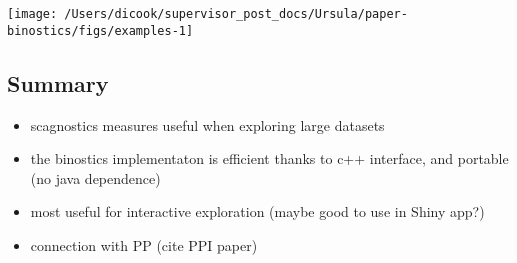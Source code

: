 \begin{Schunk}


\begin{center}\texttt{[image: /Users/dicook/supervisor\_post\_docs/Ursula/paper-binostics/figs/examples-1]} \end{center}

\end{Schunk}

\hypertarget{summary}{%
\subsection{Summary}\label{summary}}

\begin{itemize}
\tightlist
\item
  scagnostics measures useful when exploring large datasets
\item
  the binostics implementaton is efficient thanks to c++ interface, and
  portable (no java dependence)
\item
  most useful for interactive exploration (maybe good to use in Shiny
  app?)
\item
  connection with PP (cite PPI paper)
\end{itemize}




\address{%
Ursula Laa\\
Affiliation\\%
line 1\\ line 2\\
%
%
%
\\\href{mailto:ursula.laa@boku.ac.at}{\nolinkurl{ursula.laa@boku.ac.at}}
}

\address{%
Dianne Cook\\
Monash University\\%
Department of Econometrics and Business Statistics\\
%
%
%
\\\href{mailto:dicook@monash.edu}{\nolinkurl{dicook@monash.edu}}
}

\address{%
Hadley Wickham\\
RStudio, PBC\\%
\\
%
%
%
\\\href{mailto:hadley@rstudio.com}{\nolinkurl{hadley@rstudio.com}}
}

\address{%
Heike Hofmann\\
Iowa State University\\%
Department of Statistics\\
%
%
%
\\\href{mailto:hofmann@iastate.edu}{\nolinkurl{hofmann@iastate.edu}}
}

